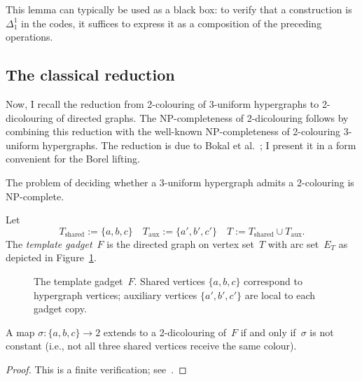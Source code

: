 This lemma can typically be used as a black box: to verify that a construction is $\Delta^1_1$ in the codes, it suffices to express it as a composition of the preceding operations.

\subsection{The classical reduction}\label{sec:classical}

Now, I recall the reduction from 2-colouring of 3-uniform hypergraphs to 2-dicolouring of directed graphs.
The NP-completeness of 2-dicolouring follows by combining this reduction with the well-known NP-completeness of 2-colouring 3-uniform hypergraphs.
The reduction is due to Bokal et al.~\cite{Bokal_2004_CircularChrom}; I present it in a form convenient for the Borel lifting.

\begin{fact}\label{fact:hyp-np}
	The problem of deciding whether a 3-uniform hypergraph admits a 2-colouring is NP-complete.
\end{fact}
 
\begin{definition}\label{def:gadget}
	Let $$T_{\mathrm{shared}}:=\{a,b,c\}\quad T_{\mathrm{aux}}:=\{a',b',c'\}\quad T:=T_{\mathrm{shared}}\cup T_{\mathrm{aux}}.$$
	The \emph{template gadget}~$F$ is the directed graph on vertex set~$T$ with arc set~$E_T$ as depicted in Figure~\ref{fig:gadget}.
\end{definition}

\begin{figure}[ht]
    \centering
    
    \caption{The template gadget~$F$. Shared vertices $\{a,b,c\}$ correspond to hypergraph vertices; auxiliary vertices $\{a',b',c'\}$ are local to each gadget copy.}
    \label{fig:gadget}
\end{figure}

\begin{lemma}\label{lemma:gadget-property}
	A map $\sigma\colon\{a,b,c\}\to 2$ extends to a 2-dicolouring of~$F$ if and only if~$\sigma$ is not constant (i.e., not all three shared vertices receive the same colour).
\end{lemma}

\begin{proof}
	This is a finite verification; see~\cite[Theorem~3.1]{Bokal_2004_CircularChrom}.
\end{proof}

